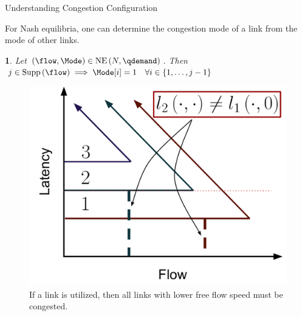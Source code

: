 \documentclass[xcolor=svgnames, english, smaller]{beamer}
\theoremstyle{plain}
\theoremstyle{definition}
\theoremstyle{plain}
\newtheorem{lem}[thm]{\protect\lemmaname}
\theoremstyle{plain}
\providecommand{\lemmaname}{Lemma}
\begin{document}
\begin{frame}{Understanding Congestion Configuration}

For Nash equilibria, one can determine the congestion mode of a link
from the mode of other links.
\begin{lem}
\label{lem:filluplower}Let $\left(\flow,\Mode\right)\in\NashEquilibrium{\NLinks}{\qdemand}$.
Then $j\in\Supp{\flow}\implies\Mode[i]=1\quad\forall i\in\left\{ 1,\ldots,j-1\right\} $


\end{lem}
\begin{figure}
\begin{centering}
\includegraphics[scale=0.25]{../../figures/presentation/LemmaLowerIndexLinksCongested}
\par\end{centering}

\caption{If a link is utilized, then all links with lower free flow speed must
be congested.}
\end{figure}



\end{frame}
\end{document}
